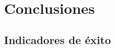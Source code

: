 \documentclass[12pt]{report} %
\begin{document}


\chapter{Conclusiones}

\section{Indicadores de éxito}

\clearpage

\printglossary[type=\acronymtype]

\printglossary




\end{document}

